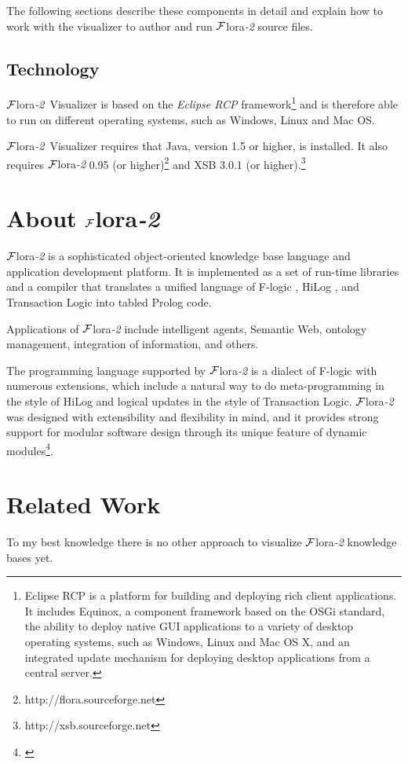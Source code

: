 \documentclass[a4paper,11pt]{article}
\newcommand{\FLORA}{{\mbox{\sc ${\cal F}${lora}\rm\emph{-2}}}\xspace}
\newcommand{\FVIZ}{{\mbox{\sc ${\cal F}${lora}\rm\emph{-2} {Visualizer}}}\xspace}
\newcommand{\fl}{\mbox{F-logic}\xspace}
\begin{document}
The following sections describe these components in detail and explain how
to work with the visualizer to author and run \FLORA source files.

\subsection{Technology}
\label{sec:introduction_technology}

\FVIZ is based on the \emph{Eclipse RCP} framework\footnote{
Eclipse RCP is a platform for building and deploying rich client applications.
It includes Equinox, a component framework based on the OSGi standard, the
ability to deploy native GUI applications to a variety of desktop operating
systems, such as Windows, Linux and Mac OS X, and an integrated update mechanism
for deploying desktop applications from a central server.\cite{erh}
  }
and is therefore able to
run on different operating systems, such as Windows, Linux and Mac OS.

\FVIZ requires that
Java, version 1.5 or higher, is installed. It also requires
\FLORA 0.95 (or higher)\footnote{http://flora.sourceforge.net}
and XSB 3.0.1 (or higher).\footnote{http://xsb.sourceforge.net}

\section{About \FLORA}
\label{sec:flora}

\FLORA is a sophisticated object-oriented knowledge base language and
application development platform. It is implemented as a set of run-time
libraries and a compiler that translates a unified language of \fl
\cite{KLW95}, HiLog \cite{hilog-jlp}, and Transaction Logic
\cite{trans-chapter-98,trans-tcs94} into tabled Prolog code.

Applications of \FLORA include intelligent agents, Semantic Web, ontology
management, integration of information, and others.

The programming language supported by \FLORA is a dialect of \fl with
numerous extensions, which include a natural way to do meta-programming in
the style of HiLog and logical updates in the style of Transaction
Logic. \FLORA was designed with extensibility and flexibility in mind, and
it provides strong support for modular software design through its unique
feature of dynamic modules\footnote{\cite{flora-manual}}.

\section{Related Work}
\label{floravisualizer_relatedwork}
To my best knowledge there is no other approach to visualize
\FLORA knowledge bases yet.
\end{document}
